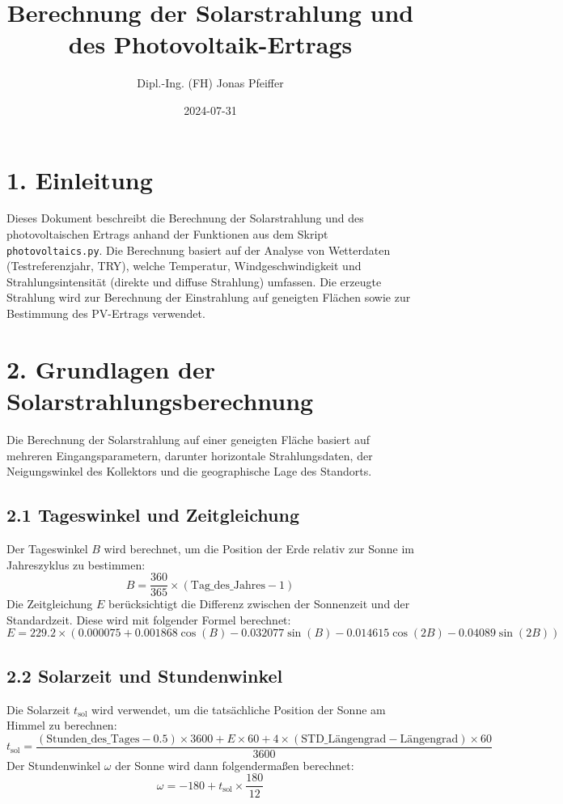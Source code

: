 \documentclass{article}
\title{Berechnung der Solarstrahlung und des Photovoltaik-Ertrags}
\author{Dipl.-Ing. (FH) Jonas Pfeiffer}
\date{2024-07-31}
\begin{document}
\maketitle

\section*{1. Einleitung}
Dieses Dokument beschreibt die Berechnung der Solarstrahlung und des photovoltaischen Ertrags anhand der Funktionen aus dem Skript \texttt{photovoltaics.py}. Die Berechnung basiert auf der Analyse von Wetterdaten (Testreferenzjahr, TRY), welche Temperatur, Windgeschwindigkeit und Strahlungsintensität (direkte und diffuse Strahlung) umfassen. Die erzeugte Strahlung wird zur Berechnung der Einstrahlung auf geneigten Flächen sowie zur Bestimmung des PV-Ertrags verwendet.

\section*{2. Grundlagen der Solarstrahlungsberechnung}
Die Berechnung der Solarstrahlung auf einer geneigten Fläche basiert auf mehreren Eingangsparametern, darunter horizontale Strahlungsdaten, der Neigungswinkel des Kollektors und die geographische Lage des Standorts.

\subsection*{2.1 Tageswinkel und Zeitgleichung}
Der Tageswinkel \( B \) wird berechnet, um die Position der Erde relativ zur Sonne im Jahreszyklus zu bestimmen:
\[
B = \frac{360}{365} \times (\text{Tag\_des\_Jahres} - 1)
\]
Die Zeitgleichung \( E \) berücksichtigt die Differenz zwischen der Sonnenzeit und der Standardzeit. Diese wird mit folgender Formel berechnet:
\[
E = 229.2 \times \left( 0.000075 + 0.001868 \cos(B) - 0.032077 \sin(B) - 0.014615 \cos(2B) - 0.04089 \sin(2B) \right)
\]

\subsection*{2.2 Solarzeit und Stundenwinkel}
Die Solarzeit \( t_{\text{sol}} \) wird verwendet, um die tatsächliche Position der Sonne am Himmel zu berechnen:
\[
t_{\text{sol}} = \frac{(\text{Stunden\_des\_Tages} - 0.5) \times 3600 + E \times 60 + 4 \times (\text{STD\_Längengrad} - \text{Längengrad}) \times 60}{3600}
\]
Der Stundenwinkel \( \omega \) der Sonne wird dann folgendermaßen berechnet:
\[
\omega = -180 + t_{\text{sol}} \times \frac{180}{12}
\]
\end{document}
